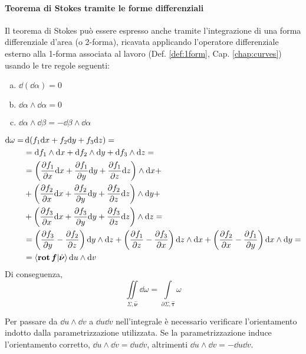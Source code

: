\paragraph{Teorema di Stokes tramite le forme differenziali}

Il teorema di Stokes può essere espresso anche tramite l'integrazione di una forma differenziale d'area (o 2-forma), ricavata applicando l'operatore differenziale esterno alla 1-forma associata al lavoro (Def. \ref{def:1form}, Cap. \ref{chap:curves}) usando le tre regole seguenti:
\begin{enumerate}[a.]
	\item $\dd(\dd \alpha)=0$
	\item $\dd \alpha \wedge \dd \alpha=0$
	\item $\dd \alpha \wedge \dd \beta = -\dd \beta \wedge \dd \alpha$
\end{enumerate}

\begin{align*}
	\dd \omega =& \dd (f_1 \dd x+f_2 \dd y+f_3 \dd z)=\\
	&=\dd f_1\wedge \dd x +\dd f_2 \wedge \dd y +\dd f_3 \wedge \dd z=\\
	&=\left( \frac{\partial f_1}{\partial x}\dd x + \frac{\partial f_1}{\partial y}\dd y + \frac{\partial f_1}{\partial z}\dd z \right)\wedge \dd x+\\
	&+\left( \frac{\partial f_2}{\partial x}\dd x + \frac{\partial f_2}{\partial y}\dd y + \frac{\partial f_2}{\partial z}\dd z \right)\wedge \dd y +\\ 
	&+\left(\frac{\partial f_3}{\partial x}\dd x + \frac{\partial f_3}{\partial y}\dd y + \frac{\partial f_3}{\partial z}\dd z\right) \wedge \dd z= \\
	&=\left(\frac{\partial f_3}{\partial y}-\frac{\partial f_2}{\partial z}\right)\dd y \wedge \dd z+
	\left(\frac{\partial f_1}{\partial z}-\frac{\partial f_3}{\partial x}\right)\dd z \wedge \dd x+
	\left(\frac{\partial f_2}{\partial x}-\frac{\partial f_1}{\partial y}\right)\dd x \wedge \dd y
	=\\
	&=\ip{\rot \vecf}{\hat{\bm \nu}} \dd u \wedge \dd v
\end{align*}
Di conseguenza,
$$
	\iint\limits_{\Sigma,\hat{\bm \nu}} \dd \omega = \int\limits_{\partial \Sigma,\hat{\bm \tau}} \omega
$$

\begin{remark}
	Per passare da $\dd u \wedge \dd v$ a $\dd u \dd v$ nell'integrale è necessario verificare l'orientamento indotto dalla parametrizzazione utilizzata. Se la parametrizzazione induce l'orientamento corretto, $\dd u \wedge \dd v = \dd u \dd v$, altrimenti $\dd u \wedge \dd v= -\dd u \dd v$.  
\end{remark}

